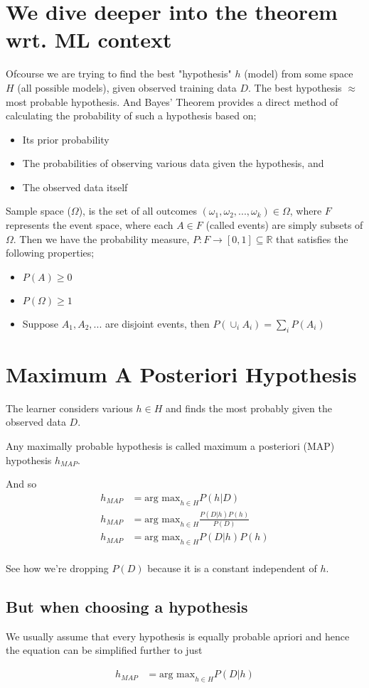 \documentclass{article}
\begin{document}
\section{We dive deeper into the theorem wrt. ML context}
Ofcourse we are trying to find the best "hypothesis" $h$ (model) from some space $H$ (all possible models), given observed training data $D$. The best hypothesis $\approx$ most probable hypothesis. And Bayes' Theorem provides a direct method of calculating the probability of such a hypothesis based on;

\begin{itemize}
	\item Its prior probability
	\item The probabilities of observing various data given the hypothesis, and
	\item The observed data itself
\end{itemize}

Sample space ($\Omega$), is the set of all outcomes $(\omega_1, \omega_2, ..., \omega_k) \in \Omega$, where $F$ represents the event space, where each $A \in F$ (called events) are simply subsets of $\Omega$. Then we have the probability measure, $P: F \rightarrow [0,1] \subseteq \mathbb{R}$ that satisfies the following properties;

\begin{itemize}
	\item $P(A) \geq 0$
	\item $P(\Omega) \geq 1$
	\item Suppose $A_1, A_2, ...$ are disjoint events, then $P(\cup_i A_i) = \sum_{i}P(A_i)$
\end{itemize}

\section{Maximum A Posteriori Hypothesis}
The learner considers various $h \in H$ and finds the most probably given the observed data $D$.

Any maximally probable hypothesis is called maximum a posteriori (MAP) hypothesis $h_{MAP}$.

And so
\begin{align*}
	h_{MAP} &= \text{arg max}_{h \in H} P(h | D) \\
	h_{MAP} &= \text{arg max}_{h \in H} \frac{P(D | h)P(h)}{P(D)} \\
	h_{MAP} &= \text{arg max}_{h \in H} P(D | h)P(h) \\
\end{align*}

See how we're dropping $P(D)$ because it is a constant independent of $h$.

\subsection{But when choosing a hypothesis}
We usually assume that every hypothesis is equally probable apriori and hence the equation can be simplified further to just

\begin{align*}
	h_{MAP} &= \text{arg max}_{h \in H} P(D | h) \\
\end{align*}
\end{document}
